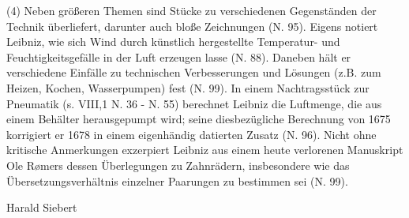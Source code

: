 \par
(4) Neben grö{\ss}eren Themen sind Stücke zu verschiedenen Gegenständen der Technik überliefert, darunter auch blo{\ss}e Zeichnungen (N. 95). Eigens notiert Leibniz, wie sich Wind durch künstlich hergestellte Temperatur- und Feuchtigkeitsgefälle in der Luft erzeugen lasse (N. 88). Daneben hält er verschiedene Einfälle zu technischen Verbesserungen und Lösungen (z.B. zum Heizen, Kochen, Wasserpumpen) fest (N. 99). In einem Nachtragsstück zur Pneumatik (s. VIII,1 N. 36 - N. 55) berechnet Leibniz die Luftmenge, die aus einem Behälter herausgepumpt wird; seine diesbezügliche Berechnung von 1675 korrigiert er 1678 in einem eigenhändig datierten Zusatz (N. 96). Nicht ohne kritische Anmerkungen exzerpiert Leibniz aus einem heute verlorenen Manuskript Ole R{\o}mers dessen Überlegungen zu Zahnrädern, insbesondere wie das Übersetzungsverhältnis einzelner Paarungen zu bestimmen sei (N. 99).
\par
\vspace*{2em}
\hspace{95mm}Harald Siebert
